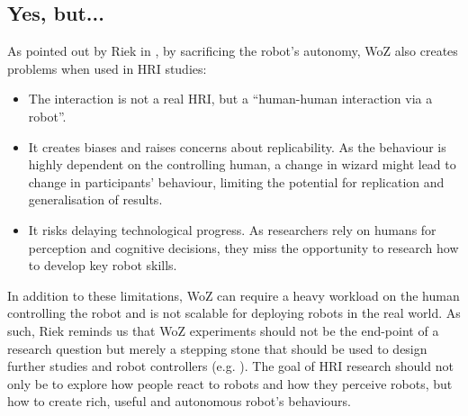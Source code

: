 \documentclass[manuscript, review, anonymous]{acmart}
\newcommand{\ES}[1]{\added[id=ES]{#1}}
\begin{document}

\subsection{Yes, but...} \label{sec:but}

As pointed out by Riek in \cite{riek2012wizard}, by sacrificing the robot's
autonomy, WoZ also creates problems when used in HRI studies:

\begin{itemize}

    \item The interaction is not a real HRI, but a ``human-human interaction via
        a robot''.


    \item It creates biases and raises concerns about replicability. As the
        behaviour is highly dependent on the controlling human, a change in wizard might lead
        to change in participants' behaviour, limiting the potential for
        replication and generalisation of results.

    \item It risks delaying technological progress. As researchers rely on
        humans for perception and cognitive decisions, they miss the opportunity
        to research how to develop key robot skills.


\end{itemize}
In addition to these limitations, WoZ can require a heavy workload on the human
controlling the robot and is not scalable for deploying robots in the real
world. As such, Riek reminds us that WoZ experiments should not be the end-point of
a research question but merely a stepping stone that should be used to design
further studies and robot controllers (e.g. \cite{maulsby1993prototyping}). 
The goal of HRI research should not only
be to explore how people react to robots and how they perceive robots, but how to create rich,
useful and autonomous robot's behaviours.
\end{document}
